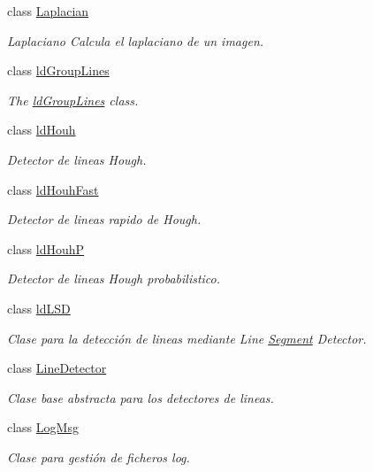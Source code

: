 \begin{DoxyCompactItemize}
class \hyperlink{class_i3_d_1_1_laplacian}{Laplacian}
\begin{DoxyCompactList}\small\item\em Laplaciano Calcula el laplaciano de un imagen. \end{DoxyCompactList}\item 
class \hyperlink{class_i3_d_1_1ld_group_lines}{ld\+Group\+Lines}
\begin{DoxyCompactList}\small\item\em The \hyperlink{class_i3_d_1_1ld_group_lines}{ld\+Group\+Lines} class. \end{DoxyCompactList}\item 
class \hyperlink{class_i3_d_1_1ld_houh}{ld\+Houh}
\begin{DoxyCompactList}\small\item\em Detector de lineas Hough. \end{DoxyCompactList}\item 
class \hyperlink{class_i3_d_1_1ld_houh_fast}{ld\+Houh\+Fast}
\begin{DoxyCompactList}\small\item\em Detector de lineas rapido de Hough. \end{DoxyCompactList}\item 
class \hyperlink{class_i3_d_1_1ld_houh_p}{ld\+HouhP}
\begin{DoxyCompactList}\small\item\em Detector de lineas Hough probabilistico. \end{DoxyCompactList}\item 
class \hyperlink{class_i3_d_1_1ld_l_s_d}{ld\+L\+SD}
\begin{DoxyCompactList}\small\item\em Clase para la detección de lineas mediante Line \hyperlink{class_i3_d_1_1_segment}{Segment} Detector. \end{DoxyCompactList}\item 
class \hyperlink{class_i3_d_1_1_line_detector}{Line\+Detector}
\begin{DoxyCompactList}\small\item\em Clase base abstracta para los detectores de lineas. \end{DoxyCompactList}\item 
class \hyperlink{class_i3_d_1_1_log_msg}{Log\+Msg}
\begin{DoxyCompactList}\small\item\em Clase para gestión de ficheros log. \end{DoxyCompactList}\item 

\end{DoxyCompactItemize}
